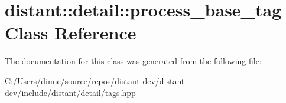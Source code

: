 \hypertarget{classdistant_1_1detail_1_1process__base__tag}{}\section{distant\+:\+:detail\+:\+:process\+\_\+base\+\_\+tag Class Reference}
\label{classdistant_1_1detail_1_1process__base__tag}


The documentation for this class was generated from the following file\+:\begin{DoxyCompactItemize}
\item 
C\+:/\+Users/dinne/source/repos/distant dev/distant dev/include/distant/detail/tags.\+hpp\end{DoxyCompactItemize}
